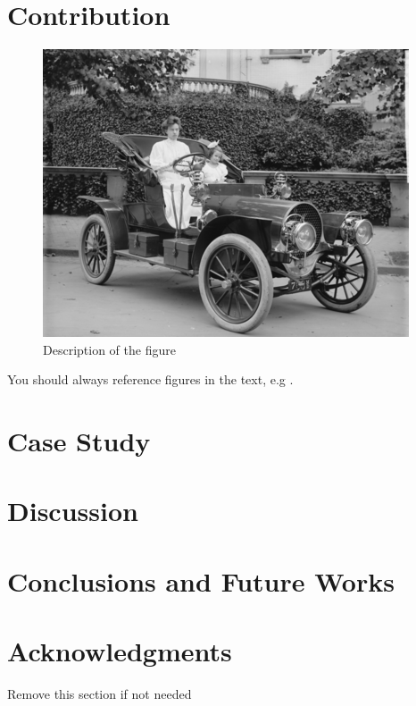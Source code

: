 \documentclass{ceurart}
\begin{document}
\section{Contribution}

\begin{figure}
    \includegraphics[width=\linewidth]{figures/sample-franklin.png}
    \caption{Description of the figure}
    \label{fig:key-here}
\end{figure}

You should always reference figures in the text, e.g .

\section{Case Study}

\section{Discussion}

\section{Conclusions and Future Works}

\section*{Acknowledgments}

Remove this section if not needed


\end{document}
